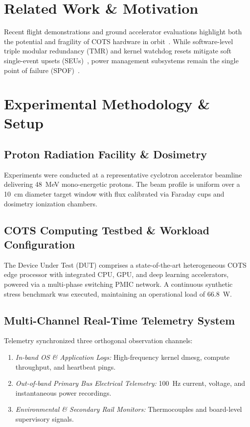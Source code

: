 \documentclass[conference]{IEEEtran}
\begin{document}
\section{Related Work \& Motivation}
Recent flight demonstrations and ground accelerator evaluations highlight both the potential and fragility of COTS hardware in orbit~\cite{ref12,ref13}. While software-level triple modular redundancy (TMR) and kernel watchdog resets mitigate soft single-event upsets (SEUs)~\cite{ref14}, power management subsystems remain the single point of failure (SPOF)~\cite{ref15,ref16}.

\section{Experimental Methodology \& Setup}
\subsection{Proton Radiation Facility \& Dosimetry}
Experiments were conducted at a representative cyclotron accelerator beamline delivering 48~MeV mono-energetic protons. The beam profile is uniform over a 10~cm diameter target window with flux calibrated via Faraday cups and dosimetry ionization chambers.

\subsection{COTS Computing Testbed \& Workload Configuration}
The Device Under Test (DUT) comprises a state-of-the-art heterogeneous COTS edge processor with integrated CPU, GPU, and deep learning accelerators, powered via a multi-phase switching PMIC network. A continuous synthetic stress benchmark was executed, maintaining an operational load of 66.8~W.

\subsection{Multi-Channel Real-Time Telemetry System}
Telemetry synchronized three orthogonal observation channels:
\begin{enumerate}
    \item \emph{In-band OS & Application Logs:} High-frequency kernel dmesg, compute throughput, and heartbeat pings.
    \item \emph{Out-of-band Primary Bus Electrical Telemetry:} 100~Hz current, voltage, and instantaneous power recordings.
    \item \emph{Environmental & Secondary Rail Monitors:} Thermocouples and board-level supervisory signals.
\end{enumerate}
\end{document}
